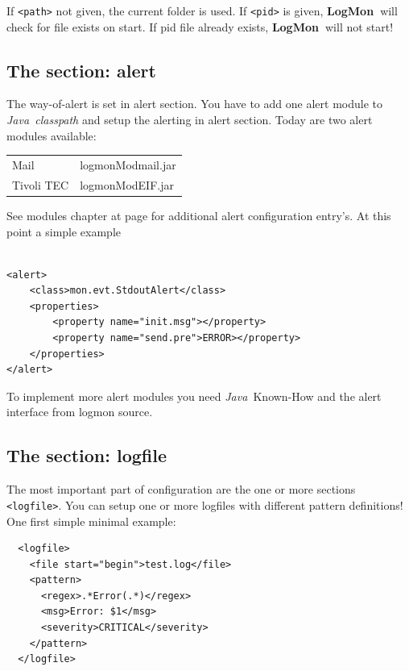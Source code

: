 \documentclass[11pt,a4paper]{article}
\newcommand{\logmon}{\textbf{LogMon\ }}
\newcommand{\java}{\textit{Java\ }}
\begin{document}
If \verb#<path># not given, the current folder is used. If \verb#<pid># is
given, \logmon will check for file exists on start. If pid file already exists,
\logmon will not start!

\subsection{The section: alert}

The way-of-alert is set in alert section. You have to add one alert module to \java \textit{classpath}
and setup the alerting in alert section. Today are two alert modules available:

\bigskip
\begin{tabular}{ll}
  Mail 	     & logmonModmail.jar\\[1ex]
  Tivoli TEC & logmonModEIF.jar\\
\end{tabular}
\bigskip

See modules chapter at page \pageref{sec:modules} for additional alert
configuration entry's. At this point a simple example

\begin{samepage}
\begin{verbatim}

<alert>
    <class>mon.evt.StdoutAlert</class>
    <properties>
        <property name="init.msg"></property>
        <property name="send.pre">ERROR></property>
    </properties>
</alert>

\end{verbatim}
\end{samepage}

To implement more alert modules you need \java Known-How and the alert interface
from logmon source.

\subsection{The section: logfile}

The most important part of configuration are the one or more sections \verb#<logfile>#. You can
setup one or more logfiles with different pattern definitions! One first simple minimal example:

\begin{samepage}
\label{ex:logfile1}
\begin{verbatim}
  <logfile>
    <file start="begin">test.log</file>
    <pattern>
      <regex>.*Error(.*)</regex>
      <msg>Error: $1</msg>
      <severity>CRITICAL</severity>
    </pattern>
  </logfile>
\end{verbatim}
\end{samepage}
\end{document}
